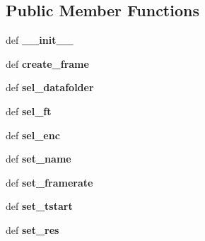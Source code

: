 \subsection*{Public Member Functions}
\begin{DoxyCompactItemize}
\item 
\hypertarget{classpyfrp__subwin_1_1dataset__dialog_a139fd0b64dba550c6848609409eeb81c}{def {\bfseries \+\_\+\+\_\+init\+\_\+\+\_\+}}\label{classpyfrp__subwin_1_1dataset__dialog_a139fd0b64dba550c6848609409eeb81c}

\item 
\hypertarget{classpyfrp__subwin_1_1dataset__dialog_ae2f6121597dd804ce4dbebee6e036e56}{def {\bfseries create\+\_\+frame}}\label{classpyfrp__subwin_1_1dataset__dialog_ae2f6121597dd804ce4dbebee6e036e56}

\item 
\hypertarget{classpyfrp__subwin_1_1dataset__dialog_adbf5e6668280041d014f18c0f10741bd}{def {\bfseries sel\+\_\+datafolder}}\label{classpyfrp__subwin_1_1dataset__dialog_adbf5e6668280041d014f18c0f10741bd}

\item 
\hypertarget{classpyfrp__subwin_1_1dataset__dialog_a2f9e730b4cb94c09577f2f83375f29ab}{def {\bfseries sel\+\_\+ft}}\label{classpyfrp__subwin_1_1dataset__dialog_a2f9e730b4cb94c09577f2f83375f29ab}

\item 
\hypertarget{classpyfrp__subwin_1_1dataset__dialog_a2e57aebd3af92b2b6a1bafd6e931cad8}{def {\bfseries sel\+\_\+enc}}\label{classpyfrp__subwin_1_1dataset__dialog_a2e57aebd3af92b2b6a1bafd6e931cad8}

\item 
\hypertarget{classpyfrp__subwin_1_1dataset__dialog_a64e2004b8cc285ccc9f738039e312151}{def {\bfseries set\+\_\+name}}\label{classpyfrp__subwin_1_1dataset__dialog_a64e2004b8cc285ccc9f738039e312151}

\item 
\hypertarget{classpyfrp__subwin_1_1dataset__dialog_acd3a21529cbffa3782cbb3116c33f839}{def {\bfseries set\+\_\+framerate}}\label{classpyfrp__subwin_1_1dataset__dialog_acd3a21529cbffa3782cbb3116c33f839}

\item 
\hypertarget{classpyfrp__subwin_1_1dataset__dialog_ad720c88fbfd0d5048c51416500cd194b}{def {\bfseries set\+\_\+tstart}}\label{classpyfrp__subwin_1_1dataset__dialog_ad720c88fbfd0d5048c51416500cd194b}

\item 
\hypertarget{classpyfrp__subwin_1_1dataset__dialog_ae4634333e8aa22c9ba886f600b2e32d5}{def {\bfseries set\+\_\+res}}\label{classpyfrp__subwin_1_1dataset__dialog_ae4634333e8aa22c9ba886f600b2e32d5}


\end{DoxyCompactItemize}

